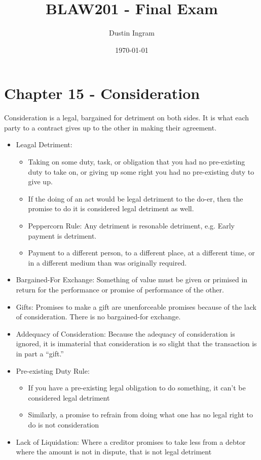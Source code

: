\documentclass{article}
\title{BLAW201 - Final Exam}
\author{Dustin Ingram}
\date{\today}
\begin{document}
	\maketitle
	\section*{Chapter 15 - Consideration}
	Consideration is a legal, bargained for detriment on both sides. It is what each party to a contract gives up to the other in making their agreement.
	  \begin{itemize}
	    \item Leagal Detriment:
		\begin{itemize}
			\item Taking on some duty, task, or obligation that you had no pre-existing duty to take on, or giving up some right you had no pre-existing duty to give up.
			\item If the doing of an act would be legal detriment to the do-er, then the promise to do it is considered legal detriment as well.
		    \item Peppercorn Rule: Any detriment is resonable detriment, e.g. Early payment is detriment.	
			\item Payment to a different person, to a different place, at a different time, or in a different medium than was originally required.
		\end{itemize}
	    \item Bargained-For Exchange: Something of value must be given or primised in return for the performance or promise of performance of the other.
		\item Gifts: Promises to make a gift are unenforceable promises because of the lack of consideration. There is no bargained-for exchange.
		\item Addequacy of Consideration: Because the adequacy of consideration is ignored, it is immaterial that consideration is so slight that the transaction is in part a ``gift.''
	    \item Pre-existing Duty Rule: 
		\begin{itemize}		
			\item If you have a pre-existing legal obligation to do something, it can't be considered legal detriment
			\item Similarly, a promise to refrain from doing what one has no legal right to do is not consideration
		\end{itemize}
	    \item Lack of Liquidation: Where a creditor promises to take less from a debtor where the amount is not in dispute, that is not legal detriment

\end{itemize}
\end{document}
